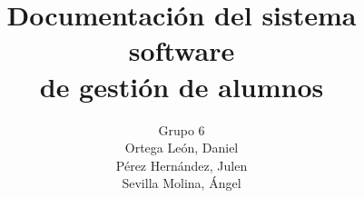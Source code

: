 \documentclass{report}
\begin{document}
	\title{Documentación del sistema software \\
	de gestión de alumnos}
	\author{Grupo 6 \\
	Ortega León, Daniel\\
	Pérez Hernández, Julen\\
	Sevilla Molina, Ángel}
 
\beforepreface
\afterpreface




\end{document}
